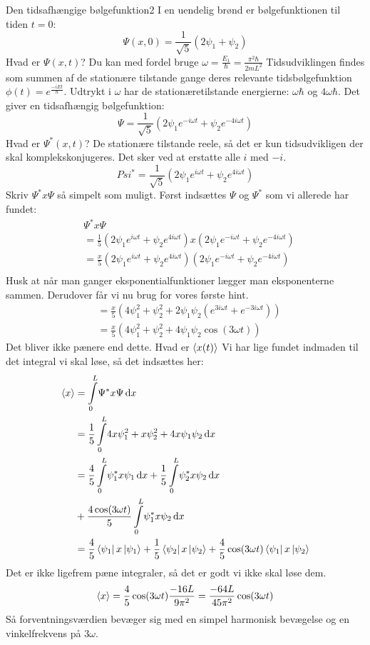 \begin{opgave}{Den tidsafhængige bølgefunktion}{2}
I en uendelig brønd er bølgefunktionen til tiden $t=0$:
$$
\Psi(x,0) = \frac{1}{\sqrt{5}}(2\psi_1+\psi_2)
$$
\opg Hvad er $\Psi(x,t)$? Du kan med fordel bruge $\omega = \frac{E_1}{\hbar} = \frac{\pi^2\hbar}{2mL^2}$
Tidsudviklingen findes som summen af de stationære tilstande gange deres relevante tidsbølgefunktion $\phi(t) = e^{\frac{-iEt}{\hbar}}$. Udtrykt i $\omega$ har de stationæretilstande energierne: $\omega\hbar$ og $4\omega \hbar$. Det giver en tidsafhængig bølgefunktion:
$$
\Psi = \frac{1}{\sqrt{5}}(2\psi_1e^{-i\omega t}+\psi_2e^{-4i\omega t})
$$
\opg Hvad er $\Psi^*(x,t)$?
De stationære tilstande reele, så det er kun tidsudvikligen der skal komplekskonjugeres. Det sker ved at erstatte alle $i$ med $-i$.
$$
Psi^* = \frac{1}{\sqrt{5}}(2\psi_1e^{i\omega t}+\psi_2e^{4i\omega t})
$$
\opg Skriv $\Psi^*x\Psi$ så simpelt som muligt.
Først indsættes $\Psi$ og $\Psi^*$ som vi allerede har fundet:
\begin{align*}
    &\Psi^*x\Psi\\
    &= \frac{1}{5}(2\psi_1e^{i\omega t}+\psi_2e^{4i\omega t}) x (2\psi_1e^{-i\omega t}+\psi_2e^{-4i\omega t})\\
    &= \frac{x}{5}(2\psi_1e^{i\omega t}+\psi_2e^{4i\omega t})(2\psi_1e^{-i\omega t}+\psi_2e^{-4i\omega t})\\
\end{align*}
Husk at når man ganger eksponentialfunktioner lægger man eksponenterne sammen. Derudover får vi nu brug for vores første hint.
\begin{align*}
    &= \frac{x}{5}(4\psi_1^2+\psi_2^2+2\psi_1\psi_2(e^{3i\omega t}+e^{-3i\omega t}))\\
    &=\frac{x}{5}(4\psi_1^2+\psi_2^2+4\psi_1\psi_2\cos(3\omega t))
\end{align*}
Det bliver ikke pænere end dette.
\opg Hvad er $\left< x(t) \right>$
Vi har lige fundet indmaden til det integral vi skal løse, så det indsættes her:
\begin{align*}
    \expect x &= \integral{\Psi^*x\Psi}{x}{0}{L}\\
    &= \frac{1}{5}\integral{4x\psi_1^2+x\psi_2^2+4x\psi_1\psi_2}{x}{0}{L}\\
    &= \frac{4}{5}\integral{\psi_1^*x\psi_1}{x}{0}{L}+\frac{1}{5}\integral{\psi_2^*x\psi_2}{x}{0}{L}\\
    &+\frac{4\cos(3\omega t)}{5}\integral{\psi_1^*x\psi_2}{x}{0}{L}\\
    &=\frac{4}{5}\matrixel{\psi_1}{x}{\psi_1}+\frac{1}{5}\matrixel{\psi_2}{x}{\psi_2}+\frac{4}{5}\cos(3\omega t)\matrixel{\psi_1}{x}{\psi_2}
\end{align*}
Det er ikke ligefrem pæne integraler, så det er godt vi ikke skal løse dem.
$$
\left< x \right> = \frac{4}{5}\cos(3\omega t)\frac{-16L}{9\pi^2}=\frac{-64L}{45\pi^2}\cos(3\omega t)
$$
Så forventningsværdien bevæger sig med en simpel harmonisk bevægelse og en vinkelfrekvens på $3\omega$. 
\end{opgave}

